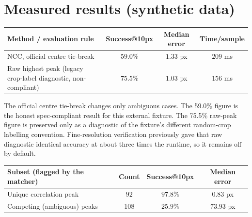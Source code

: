 \documentclass[11pt]{article}
\newcommand{\term}[1]{\textbf{\color{klablue}#1}}
\begin{document}
\section{Measured results (synthetic data)}
\label{sec:results}

\begin{center}
\end{center}

\vspace{0.3cm}

\begin{center}
\begin{tabular}{p{5.0cm}ccc}
\toprule
\term{Method / evaluation rule} & \term{Success@10px} & \term{Median error} & \term{Time/sample}\\
\midrule
NCC, official centre tie-break & $59.0\%$ & $1.33$ px & $209$ ms\\
Raw highest peak (legacy crop-label diagnostic, non-compliant) & $75.5\%$ & $1.03$ px & $156$ ms\\
\bottomrule
\end{tabular}
\end{center}

The official centre tie-break changes only ambiguous cases. The 59.0\% figure
is the honest spec-compliant result for this external fixture. The 75.5\%
raw-peak figure is preserved only as a diagnostic of the fixture's different
random-crop labelling convention. Fine-resolution verification previously gave
that raw diagnostic identical accuracy at about three times the runtime, so it
remains off by default.

\begin{center}
\begin{tabular}{lccc}
\toprule
\term{Subset (flagged by the matcher)} & \term{Count} & \term{Success@10px} & \term{Median error}\\
\midrule
Unique correlation peak      & $92$  & $\mathbf{97.8\%}$ & $0.83$ px\\
Competing (ambiguous) peaks  & $108$ & $25.9\%$          & $73.93$ px\\
\bottomrule
\end{tabular}
\end{center}
\end{document}
